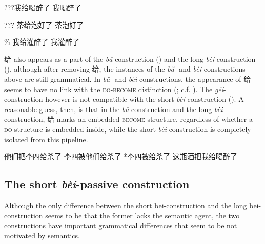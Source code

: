 \documentclass[UTF8, a4paper, oneside, scheme=plain]{ctexrep}
\newcommand{\corpus}[1]{\emph{#1}}
\newcommand*{\category}[1]{\textsc{#1}}
\begin{document}
\begin{exe}
    \ex\label{ex:verb-phrase.gei.alternation-1} \begin{xlist}
        \ex ???我给喝醉了
        \ex 我喝醉了
    \end{xlist}
    \ex\label{ex:verb-phrase.gei.alternation-2} \begin{xlist}
        \ex ??? 茶给泡好了
        \ex 茶泡好了
    \end{xlist}
    \ex\label{ex:verb-phrase.gei.alternation-3} \begin{xlist}
        \ex \% 我给灌醉了
        \ex *我灌醉了
    \end{xlist}
\end{exe}

给 also appears as a part of the \corpus{bǎ}-construction
()
and the long \corpus{bèi}-construction
(),
although after removing 给,
the instances of the \corpus{bǎ}- and \corpus{bèi}-constructions above 
are still grammatical.
In \corpus{bǎ}- and \corpus{bèi}-constructions, 
the appearance of 给 seems to have no link 
with the \category{do}-\category{become} distinction
(; c.f. ).
The \corpus{gěi}-construction however is not compatible 
with the short \corpus{bèi}-construction
().
A reasonable guess, then, 
is that in the \corpus{bǎ}-construction
and the long \corpus{bèi}-construction,
给 marks an embedded \category{become} structure,
regardless of whether a \category{do} structure is embedded inside,
while the short \corpus{bèi} construction is completely isolated 
from this pipeline.

\begin{exe}
    \ex\label{ex:verb-phrase.gei.ba-1} 他们把李四给杀了
    \ex\label{ex:verb-phrase.gei.bei-1} 李四被他们给杀了
    \ex\label{ex:verb-phrase.gei.bei-2} *李四被给杀了
    \ex\label{ex:verb-phrase.gei.ba-2} 这瓶酒把我给喝醉了
\end{exe}

\subsection{The short \corpus{bèi}-passive construction}\label{sec:verb-phrase.object.short-bei}

Although the only difference between the short bei-construction 
and the long bei-construction 
seems to be that the former lacks the semantic agent, 
the two constructions have important grammatical differences 
that seem to be not motivated by semantics. 
\end{document}
